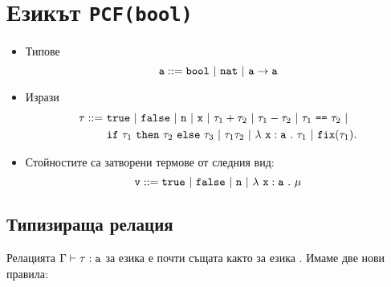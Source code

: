 \section{Езикът \texttt{PCF(bool)}}


\begin{itemize}
\item
  Типове
  \[\vv{a} ::= \bool\ |\ \nat\ |\ \vv{a}\to\vv{a}\]
\item
  Изрази
  \begin{align*}
    \tau ::=\ & \tru\ |\ \fls\ |\ \vv{n}\ |\ \vv{x}\ |\ \tau_1 + \tau_2\ |\ \tau_1 - \tau_2\ |\  \tau_1\ \vv{==}\ \tau_2\ |\\
              & \ifelse{\tau_1}{\tau_2}{\tau_3}\ |\ \tau_1\tau_2\ |\ \lamb{x}{a}{\tau_1}\ |\ \fix(\tau_1).
  \end{align*}
\item
  Стойностите са затворени термове от следния вид:
  \[\vv{v} ::= \tru\ |\ \fls\ |\ \vv{n}\ |\ \lamb{x}{a}{\mu}\]
\end{itemize}

\subsection{Типизираща релация}

Релацията $\Gamma \vdash \tau : \texttt{a}$ за езика \PCFBOOL е почти същата
както за езика \PCF. Имаме две нови правила:

